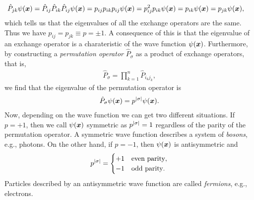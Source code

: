         \begin{align}
            \hat{P}_{jk} \psi(\boldsymbol{x})
            &= \hat{P}_{ij} \hat{P}_{ik} \hat{P}_{ij} \psi(\boldsymbol{x})
            = p_{ij} p_{ik} p_{ij} \psi(\boldsymbol{x})
            = p_{ij}^2 p_{ik} \psi(\boldsymbol{x})
            = p_{ik} \psi(\boldsymbol{x})
             = p_{jk} \psi(\boldsymbol{x}),
        \end{align}
        which tells us that the eigenvalues of all the exchange operators are
        the same.
        Thus we have $p_{ij} = p_{jk} \equiv p = \pm 1$.
        A consequence of this is that the eigenvalue of an exchange operator is
        a charateristic of the wave function $\psi(\boldsymbol{x})$.
        Furthermore, by constructing a \emph{permutation operator}
        $\hat{P}_{\sigma}$ as a product of exchange operators, that is,
        \begin{align}
            \hat{P}_{\sigma}
            = \prod_{k = 1}^{n} \hat{P}_{i_k j_k},
        \end{align}
        we find that the eigenvalue of the permutation operator is
        \begin{align}
            \hat{P}_{\sigma}\psi(\boldsymbol{x})
            = p^{\abs{\sigma}}\psi(\boldsymbol{x}).
        \end{align}
        Now, depending on the wave function we can get two different situations.
        If $p = +1$, then we call $\psi(\boldsymbol{x})$ symmetric as $p^{\abs{\sigma}}
        = 1$ regardless of the parity of the permutation operator.
        A symmetric wave function describes a system of \emph{bosons}, e.g.,
        photons.
        On the other hand, if $p = -1$, then $\psi(\boldsymbol{x})$ is antisymmetric
        and
        \begin{align}
            p^{\abs{\sigma}} =
            \begin{cases}
                +1 & \text{even parity}, \\
                -1 & \text{odd parity}.
            \end{cases}
        \end{align}
        Particles described by an antisymmetric wave function are called
        \emph{fermions}, e.g., electrons.


